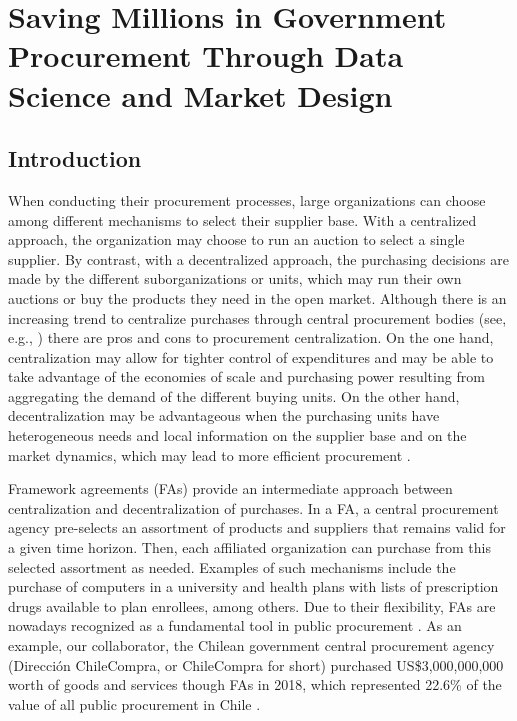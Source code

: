 \chapter{Saving Millions in Government Procurement Through Data Science and Market Design}

\section{Introduction}


When conducting their procurement processes, large organizations can choose among different mechanisms to select their supplier base. With a centralized approach, the organization may choose to run an auction to select a single supplier. By contrast, with a decentralized approach, the purchasing decisions are made by the different suborganizations or units, which may run their own auctions or buy the products they need in the open market. Although there is an increasing trend to centralize purchases through central procurement bodies (see,  e.g., \cite{oecd2019reforming}) there are pros and cons to procurement centralization. On the one hand, centralization may allow for tighter control of expenditures and may be able to take advantage of the economies of scale and purchasing power resulting from aggregating the demand of the different buying units. On the other hand, decentralization may be advantageous when the purchasing units have heterogeneous needs and local information on the supplier base and on the market dynamics, which may lead to more efficient procurement \citep{dimitri2006handbook}.

Framework agreements (FAs)  provide an intermediate approach between centralization and decentralization of purchases. In a FA, a central procurement agency pre-selects an assortment of products and suppliers that remains valid for a given time horizon. Then, each affiliated organization can purchase from this selected assortment as needed. Examples of such mechanisms include the purchase of computers in a university and health plans with lists of prescription drugs available to plan enrollees, among others. Due to their flexibility, FAs are nowadays  recognized as a fundamental tool in public procurement \citep{albano2016law}. {As an example, our collaborator, the Chilean government central procurement agency (Direcci\'on ChileCompra, or ChileCompra for short) purchased US\$3,000,000,000 worth of goods and services though FAs in 2018, which represented 22.6\% of the value of all public procurement in Chile} \citep{datosabiertos}.%

